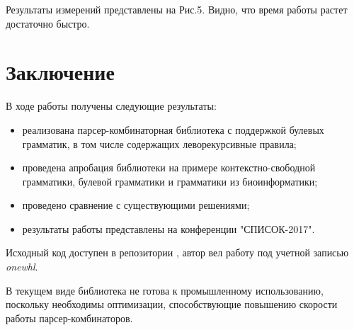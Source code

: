 Результаты измерений представлены на Рис.5. Видно, что время работы растет достаточно быстро.

\section*{Заключение}
В ходе работы получены следующие результаты:
\begin{itemize}
    \item реализована парсер-комбинаторная библиотека с поддержкой булевых грамматик, в том числе содержащих леворекурсивные правила;
    \item проведена апробация библиотеки на примере контекстно-свободной грамматики, булевой грамматики и грамматики из биоинформатики;
    \item проведено сравнение с существующими решениями;
    \item результаты работы представлены на конференции "СПИСОК-2017".
\end{itemize}
Исходный код доступен в репозитории \cite{pc}, автор вел работу под учетной записью \textit{onewhl}.

В текущем виде библиотека не готова к промышленному использованию, поскольку необходимы оптимизации, способствующие повышению скорости работы парсер-комбинаторов.


